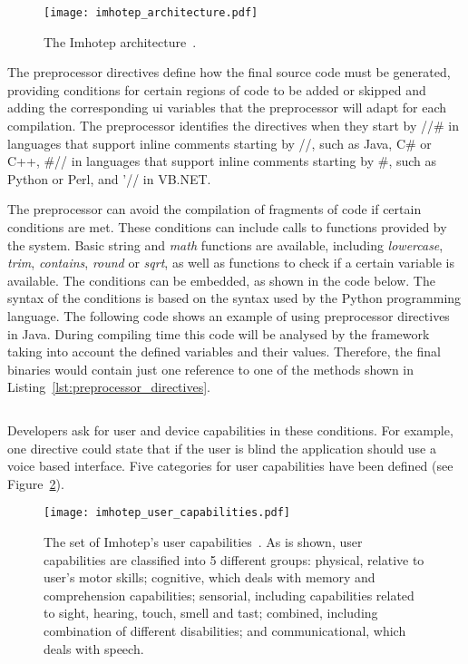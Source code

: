 \begin{figure}[H]
\centering
\texttt{[image: imhotep\_architecture.pdf]}
\caption{The Imhotep architecture~\citep{imhotep_website}.}
\label{fig:imhotep_architecture}
\end{figure}

The preprocessor directives define how the final source code must be generated, 
providing conditions for certain regions of code to be added or skipped and 
adding the corresponding \ac{ui} variables that the preprocessor will adapt for each
compilation. The preprocessor identifies the directives when they start by //\#
in languages that support inline comments starting by //, such as Java, C\# or
C++, \#// in languages that support inline comments starting by \#, such as 
Python or Perl, and '// in VB.NET.

The preprocessor can avoid the compilation of fragments of code if certain 
conditions are met. These conditions can include calls to functions provided 
by the system. Basic string and \textit{math} functions are available, including
\textit{lowercase}, \textit{trim}, \textit{contains}, \textit{round} or 
\textit{sqrt}, as well as functions to check if a certain variable is 
available. The conditions can be embedded, as shown in the code below. The 
syntax of the conditions is  based on the syntax used by the Python programming 
language. The following code shows an example of using preprocessor directives 
in Java. During compiling time this code will be analysed by the framework 
taking into account the defined variables and their values. Therefore, the final 
binaries would contain just one reference to one of the methods shown in 
Listing~\ref{lst:preprocessor_directives}.


\inputminted[linenos=true, fontsize=\footnotesize, frame=lines]{python}{5_experiments_and_results/preprocessor_directives.py}


Developers ask for user and device capabilities in these conditions. For 
example, one directive could state that if the user is blind the application 
should use a voice based interface. Five categories for user capabilities have 
been defined (see Figure~\ref{fig:imhotep_user_capabilities}).


\begin{figure}[H]
\centering
\texttt{[image: imhotep\_user\_capabilities.pdf]}
\caption{The set of Imhotep's user capabilities~\citep{imhotep_website}. As is
shown, user capabilities are classified into 5 different groups: physical, 
relative to user's motor skills; cognitive, which deals with memory and 
comprehension capabilities; sensorial, including capabilities related to 
sight, hearing, touch, smell and tast; combined, including combination of 
different disabilities; and communicational, which deals with speech.}
\label{fig:imhotep_user_capabilities}
\end{figure}

